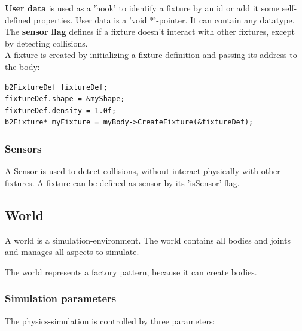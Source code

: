 \documentclass[10pt,a4paper,DIV=11]{scrreprt}
\begin{document}
\textbf{User data} is used as a 'hook' to identify a fixture by an id or add it some self-defined properties. User data is a 'void *'-pointer. It can contain any datatype. \\

The \textbf{sensor flag} defines if a fixture doesn't interact with other fixtures, except by detecting collisions. \\



A fixture is created by initializing a fixture definition and passing its address to the body:

\begin{lstlisting}[caption={Creation of a fixture (source Box2D manual)},label=lst:fixture-create]
b2FixtureDef fixtureDef;
fixtureDef.shape = &myShape;
fixtureDef.density = 1.0f;
b2Fixture* myFixture = myBody->CreateFixture(&fixtureDef);
\end{lstlisting}


\subsubsection*{Sensors}
A Sensor is used to detect collisions, without interact physically with other fixtures. A fixture can be defined as sensor by its 'isSensor'-flag.

\subsection{World}
A world is a simulation-environment. The world contains all bodies and joints and manages all aspects to simulate.

The world represents a factory pattern, because it can create bodies.

\subsubsection*{Simulation parameters}
The physics-simulation is controlled by three parameters: \\

   \\
\\
\end{document}
